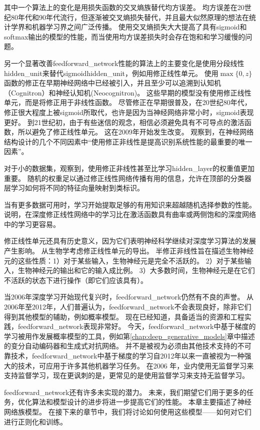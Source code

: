   
其中一个算法上的变化是用损失函数的交叉熵族替代均方误差。
均方误差在20世纪80年代和90年代流行，但逐渐被交叉熵损失替代，并且最大似然原理的想法在统计学界和机器学习界之间广泛传播。
使用交叉熵损失大大提高了具有sigmoid和softmax输出的模型的性能，而当使用均方误差损失时会存在饱和和学习缓慢的问题。

另一个显著改善\gls{feedforward_network}性能的算法上的主要变化是使用分段线性\gls{hidden_unit}来替代sigmoid\gls{hidden_unit}，例如用修正线性单元。
使用$\max\{0, z\}$函数的修正在早期神经网络中已经被引入，并且至少可以追溯到认知机（Cognitron）和神经认知机(Neocognitron)\citep{Fukushima75,Fukushima80}。
这些早期的模型没有使用修正线性单元，而是将修正用于非线性函数。
尽管修正在早期很普及，在20世纪80年代，修正很大程度上被sigmoid所取代，也许是因为当神经网络非常小时，sigmoid表现更好。
到21世纪初，由于有些迷信的观念，相信必须避免具有不可导点的激活函数，所以避免了修正线性单元。
这在2009年开始发生改变。
\cite{Jarrett-ICCV2009-small}观察到，在神经网络结构设计的几个不同因素中``使用修正非线性是提高识别系统性能的最重要的唯一因素''。

对于小的数据集，\cite{Jarrett-ICCV2009-small}观察到，使用修正非线性甚至比学习\gls{hidden_layer}的权重值更加重要。
随机的权重足以通过修正线性网络传播有用的信息，允许在顶部的分类器层学习如何将不同的特征向量映射到类标识。

当有更多数据可用时，学习开始提取足够的有用知识来超越随机选择参数的性能。
\cite{Glorot+al-AI-2011-small}说明，在深度修正线性网络中的学习比在激活函数具有曲率或两侧饱和的深度网络中的学习更容易。

修正线性单元还具有历史意义，因为它们表明神经科学继续对深度学习算法的发展产生影响。
\cite{Glorot+al-AI-2011-small}从生物学考虑修正线性单元的导出。
半修正非线性旨在描述生物神经元的这些性质：1）对于某些输入，生物神经元是完全不活跃的。
2）对于某些输入，生物神经元的输出和它的输入成比例。
3）大多数时间，生物神经元是在它们不活跃的状态下进行操作（即它们应该具有）。
  
  
当2006年深度学习开始现代复兴时，\gls{feedforward_network}仍然有不良的声誉。
从2006年至2012年，人们普遍认为，\gls{feedforward_network}不会表现良好，除非它们得到其他模型的辅助，例如概率模型。
现在已经知道，具备适当的资源和工程实践，\gls{feedforward_network}表现非常好。
今天，\gls{feedforward_network}中基于梯度的学习被用作发展概率模型的工具，例如第\ref{chap:deep_generative_models}章中描述的变分自动编码器和生成式对抗网络。
并不是被视为必须由其他技术支持的不可靠技术，\gls{feedforward_network}中基于梯度的学习自2012年以来一直被视为一种强大的技术，可应用于许多其他机器学习任务。
在2006 年，业内使用无监督学习来支持监督学习，现在更讽刺的是，更常见的是使用监督学习来支持无监督学习。

\gls{feedforward_network}还有许多未实现的潜力。
未来，我们期望它们用于更多的任务，优化算法和模型设计的进步将进一步提高它们的性能。
本章主要描述了神经网络族模型。
在接下来的章节中，我们将讨论如何使用这些模型——如何对它们进行正则化和训练。

  
  
